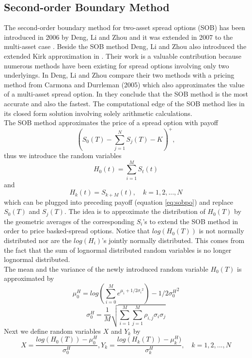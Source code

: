 \documentclass[a4paper]{article}
\begin{document}
\subsection{Second-order Boundary Method}
\label{sec:sob}
The second-order boundary method for two-asset spread options (SOB) has been introduced in 2006 by Deng, Li and Zhou \cite{sob2} and it was extended in 2007 to the multi-asset case \cite{sob}. Beside the SOB method Deng, Li and Zhou also introduced the extended Kirk approximation in \cite{sob}. Their work is a valuable contribution because numerous methods have been existing for spread options involving only two underlyings. In \cite{sob} Deng, Li and Zhou compare their two methods with a pricing method from Carmona and Durrleman (2005) \cite{cd} which also approximates the value of a multi-asset spread option. In \cite{sob} they conclude that the SOB method is the most accurate and also the fastest. The computational edge of the SOB method lies in its closed form solution involving solely arithmetic calculations.\\
The SOB method approximates the price of a spread option with payoff
\begin{equation}
\label{eq:sobpo}
(S_0(T) - \sum_{j=1}^{N}S_j(T) - K)^+, 
\end{equation}
thus we introduce the random variables 
$$H_0(t)=\sum_{i=1}^M S_t(t)$$ 
and 
$$H_k(t)=S_{k+M}(t), \quad k=1,2,...,N$$
which can be plugged into preceding payoff (equation \ref{eq:sobpo}) and replace $S_0(T)$ and $S_j(T)$. The idea is to approximate the distribution of $H_0(T)$ by the geometric averages of the corresponding  $S_i$'s to extend the SOB method in order to price basked-spread options. Notice that $log(H_0(T))$ is not normally distributed nor are the $log(H_i)$'s jointly normally distributed. This comes from the fact that the sum of lognormal distributed random variables is no longer lognormal distributed.\\
The mean and the variance of the newly introduced random variable $H_0(T)$ is approximated by 
\begin{equation}
\mu_0^H = log(\sum_{i=0}^{M}e^{\mu_i+1/2{\sigma_i}^2}) - 1/2{\sigma_0^H}^2
\end{equation}
\begin{equation}
\sigma_0^H=\frac{1}{M}\sqrt{\sum_{i=1}^M \sum_{j=1}^M \rho_{i,j} \sigma_i \sigma_j}
\end{equation}
Next we define random variables $X$ and $Y_k$ by
$$X = \frac{log(H_0(T))-\mu_0^H}{\sigma_0^H}, Y_k = \frac{log(H_k(T))-\mu_k^H)}{\sigma_k^H}, \quad k=1,2,...,N$$
\end{document}
